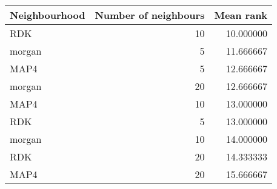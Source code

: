 \begin{tabular}{lrr}
\toprule
Neighbourhood & Number of neighbours & Mean rank \\
\midrule
RDK & 10 & 10.000000 \\
morgan & 5 & 11.666667 \\
MAP4 & 5 & 12.666667 \\
morgan & 20 & 12.666667 \\
MAP4 & 10 & 13.000000 \\
RDK & 5 & 13.000000 \\
morgan & 10 & 14.000000 \\
RDK & 20 & 14.333333 \\
MAP4 & 20 & 15.666667 \\
\bottomrule
\end{tabular}
